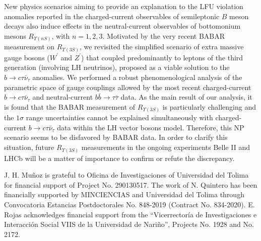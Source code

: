 \documentclass[reprint,showpacs,aps,prd,nofootinbib,superscriptaddress,longbibliography]{revtex4-1}
\begin{document}
New physics scenarios aiming to provide an explanation to the LFU violation anomalies reported in the charged-current observables of semileptonic $B$ meson decays also induce effects in the neutral-current observables of bottomonium mesons $R_{\Upsilon(nS)}$, with $n=1,2,3$. Motivated by the very recent BABAR measurement on $R_{\Upsilon(3S)}$, we revisited the simplified scenario of extra massive gauge bosons ($W^\prime$ and $Z^\prime$) that coupled predominantly to leptons of the third generation (involving LH neutrinos), proposed as a viable solution to the $b \to c \tau \bar{\nu}_\tau$ anomalies. We performed a robust phenomenological analysis of the parametric space of gauge couplings allowed by the most recent charged-current $b \to c \tau \bar{\nu}_\tau$ and neutral-current $b \bar{b} \to \tau\bar{\tau}$ data. As the main result of our analysis, it is found that the BABAR measurement of $R_{\Upsilon(3S)}$ is particularly challenging and the $1\sigma$ range uncertainties cannot be explained simultaneously with charged-current $b \to c \tau \bar{\nu}_\tau$ data within the LH vector bosons model. Therefore, this NP scenario seems to be disfavored by BABAR data. In order to clarify this situation, future $R_{\Upsilon(3S)}$ measurements in the ongoing experiments Belle II and LHCb will be a matter of importance to confirm or refute the discrepancy.



\acknowledgments
J. H. Mu\~{n}oz is grateful to Oficina de Investigaciones of Universidad del Tolima for financial support of Project No. 290130517. The work of N. Quintero has been financially supported by MINCIENCIAS and Universidad del Tolima through Convocatoria Estancias Postdoctorales No. 848-2019 (Contract No. 834-2020). E. Rojas acknowledges financial support from the “Vicerrectoría de Investigaciones e Interacción Social VIIS de la Universidad de Nariño”, Projects No. 1928 and No. 2172. 


\FloatBarrier
\end{document}
